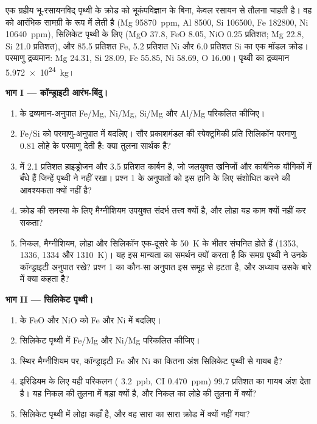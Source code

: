 \begin{problem}
\label{pb:b2:elements-in-the-earth:1}
एक ग्रहीय भू-रसायनविद् पृथ्वी के क्रोड को भूकंपविज्ञान के बिना, केवल
रसायन से तौलना चाहती है। वह  को आरंभिक सामग्री के रूप में लेती है (Mg
\qty{95870}{ppm}, Al 8500, Si \num{106500}, Fe \num{182800}, Ni
\qty{10640}{ppm}), सिलिकेट पृथ्वी के लिए  (MgO 37.8, FeO
8.05, NiO 0.25 प्रतिशत; Mg 22.8, Si 21.0 प्रतिशत), और 85.5
प्रतिशत Fe, 5.2 प्रतिशत Ni और 6.0 प्रतिशत Si का एक मॉडल क्रोड। परमाणु द्रव्यमान: Mg 24.31,
Si 28.09, Fe 55.85, Ni 58.69, O 16.00। पृथ्वी का द्रव्यमान
\qty{5.972e24}{kg}।

\medskip\noindent\textbf{भाग I --- कॉन्ड्राइटी आरंभ-बिंदु।}
\begin{enumerate}
\item {} के द्रव्यमान-अनुपात Fe/Mg, Ni/Mg, Si/Mg और Al/Mg परिकलित कीजिए।
\item Fe/Si को परमाणु-अनुपात में बदलिए। सौर प्रकाशमंडल की स्पेक्ट्रमिकी
प्रति सिलिकॉन परमाणु 0.81 लोहे के परमाणु देती है: क्या तुलना सार्थक है?
\item {} में 2.1 प्रतिशत हाइड्रोजन और 3.5 प्रतिशत कार्बन है, जो
जलयुक्त खनिजों और कार्बनिक यौगिकों में बँधे हैं जिन्हें पृथ्वी ने नहीं रखा। प्रश्न 1 के
अनुपातों को इस हानि के लिए संशोधित करने की आवश्यकता क्यों नहीं है?
\item क्रोड की समस्या के लिए मैग्नीशियम उपयुक्त संदर्भ तत्त्व क्यों है, और
लोहा यह काम क्यों नहीं कर सकता?
\item निकल, मैग्नीशियम, लोहा और सिलिकॉन एक-दूसरे के \qty{50}{K} के भीतर संघनित होते हैं
(1353, 1336, 1334 और \qty{1310}{K})। यह इस
मान्यता का समर्थन क्यों करता है कि समग्र पृथ्वी ने उनके कॉन्ड्राइटी अनुपात रखे? प्रश्न 1 का कौन-सा अनुपात
इस समूह से हटता है, और अध्याय उसके बारे में क्या कहता है?
\end{enumerate}

\noindent\textbf{भाग II --- सिलिकेट पृथ्वी।}
\begin{enumerate}[resume]
\item {} के FeO और NiO को Fe और Ni में बदलिए।
\item सिलिकेट पृथ्वी में Fe/Mg और Ni/Mg परिकलित कीजिए।
\item स्थिर मैग्नीशियम पर, कॉन्ड्राइटी Fe और Ni का कितना अंश सिलिकेट
पृथ्वी से गायब है?
\item इरिडियम के लिए यही परिकलन ( \qty{3.2}{ppb}, CI
\qty{0.470}{ppm}) 99.7 प्रतिशत का गायब अंश देता है। यह निकल की तुलना में
बड़ा क्यों है, और निकल का लोहे की तुलना में क्यों?
\item सिलिकेट पृथ्वी में लोहा कहाँ है, और वह सारा का सारा
क्रोड में क्यों नहीं गया?
\end{enumerate}


\end{problem}

